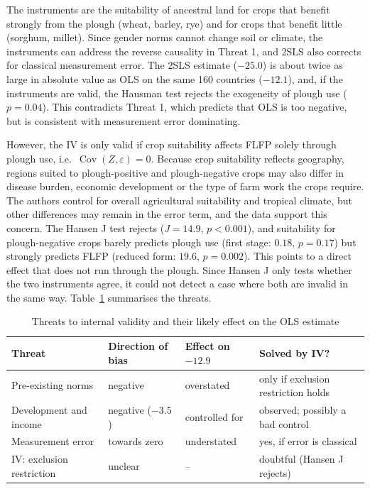 \documentclass[12pt,a4paper]{article}
\begin{document}
The instruments are the suitability of ancestral land for crops that benefit strongly from the plough (wheat, barley, rye) and for crops that benefit little (sorghum, millet). Since gender norms cannot change soil or climate, the instruments can address the reverse causality in Threat 1, and 2SLS also corrects for classical measurement error. The 2SLS estimate ($-25.0$) is about twice as large in absolute value as OLS on the same 160 countries ($-12.1$), and, if the instruments are valid, the Hausman test rejects the exogeneity of plough use ($p = 0.04$). This contradicts Threat 1, which predicts that OLS is too negative, but is consistent with measurement error dominating.

However, the IV is only valid if crop suitability affects FLFP solely through plough use, i.e.\ $\operatorname{Cov}(Z, \varepsilon) = 0$. Because crop suitability reflects geography, regions suited to plough-positive and plough-negative crops may also differ in disease burden, economic development or the type of farm work the crops require. The authors control for overall agricultural suitability and tropical climate, but other differences may remain in the error term, and the data support this concern. The Hansen J test rejects ($J = 14.9$, $p < 0.001$), and suitability for plough-negative crops barely predicts plough use (first stage: $0.18$, $p = 0.17$) but strongly predicts FLFP (reduced form: $19.6$, $p = 0.002$). This points to a direct effect that does not run through the plough. Since Hansen J only tests whether the two instruments agree, it could not detect a case where both are invalid in the same way. Table~\ref{tab:threats} summarises the threats.

\begin{table}[htbp]
\centering
\caption{Threats to internal validity and their likely effect on the OLS estimate}
\label{tab:threats}
\small
\begin{tabular}{llll}
\hline
Threat & Direction of bias & Effect on $-12.9$ & Solved by IV? \\
\hline
Pre-existing norms & negative & overstated & only if exclusion restriction holds \\
Development and income & negative ($-3.5$) & controlled for & observed; possibly a bad control \\
Measurement error & towards zero & understated & yes, if error is classical \\
IV: exclusion restriction & unclear & -- & doubtful (Hansen J rejects) \\
\hline
\end{tabular}
\end{table}
\end{document}
